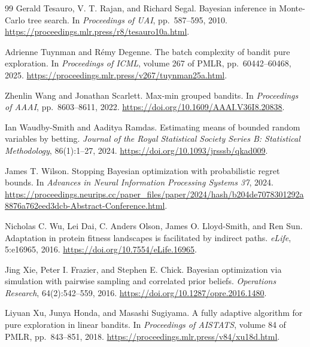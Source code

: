 \documentclass{article}
\theoremstyle{plain}
\theoremstyle{definition}
\begin{document}
\begin{thebibliography}{99}
Gerald Tesauro, V. T. Rajan, and Richard Segal.
Bayesian inference in Monte-Carlo tree search.
In \emph{Proceedings of UAI}, pp.\ 587--595, 2010.
\url{https://proceedings.mlr.press/r8/tesauro10a.html}.

Adrienne Tuynman and R\'emy Degenne.
The batch complexity of bandit pure exploration.
In \emph{Proceedings of ICML}, volume 267 of PMLR, pp.\ 60442--60468, 2025.
\url{https://proceedings.mlr.press/v267/tuynman25a.html}.

Zhenlin Wang and Jonathan Scarlett.
Max-min grouped bandits.
In \emph{Proceedings of AAAI}, pp.\ 8603--8611, 2022.
\url{https://doi.org/10.1609/AAAI.V36I8.20838}.

Ian Waudby-Smith and Aaditya Ramdas.
Estimating means of bounded random variables by betting.
\emph{Journal of the Royal Statistical Society Series B: Statistical Methodology}, 86(1):1--27, 2024.
\url{https://doi.org/10.1093/jrsssb/qkad009}.

James T. Wilson.
Stopping Bayesian optimization with probabilistic regret bounds.
In \emph{Advances in Neural Information Processing Systems 37}, 2024.
\url{https://proceedings.neurips.cc/paper_files/paper/2024/hash/b204de7078301292a8876a762eed3dcb-Abstract-Conference.html}.

Nicholas C. Wu, Lei Dai, C. Anders Olson, James O. Lloyd-Smith, and Ren Sun.
Adaptation in protein fitness landscapes is facilitated by indirect paths.
\emph{eLife}, 5:e16965, 2016.
\url{https://doi.org/10.7554/eLife.16965}.

Jing Xie, Peter I. Frazier, and Stephen E. Chick.
Bayesian optimization via simulation with pairwise sampling and correlated prior beliefs.
\emph{Operations Research}, 64(2):542--559, 2016.
\url{https://doi.org/10.1287/opre.2016.1480}.

Liyuan Xu, Junya Honda, and Masashi Sugiyama.
A fully adaptive algorithm for pure exploration in linear bandits.
In \emph{Proceedings of AISTATS}, volume 84 of PMLR, pp.\ 843--851, 2018.
\url{https://proceedings.mlr.press/v84/xu18d.html}.


\end{thebibliography}
\end{document}

